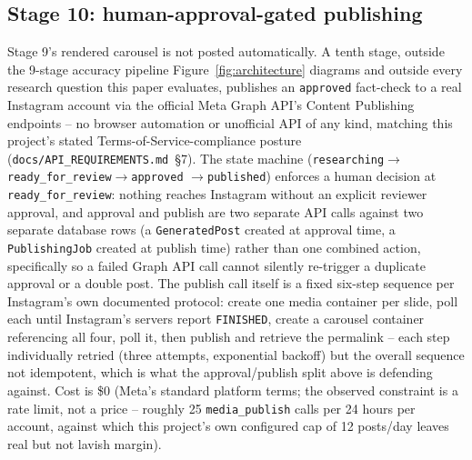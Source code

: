 \documentclass[conference]{IEEEtran}
\begin{document}
\subsection{Stage 10: human-approval-gated publishing}
\label{sec:publishing}
Stage 9's rendered carousel is not posted automatically. A tenth stage,
outside the 9-stage accuracy pipeline Figure~\ref{fig:architecture}
diagrams and outside every research question this paper evaluates,
publishes an \texttt{approved} fact-check to a real Instagram account via
the official Meta Graph API's Content Publishing endpoints -- no browser
automation or unofficial API of any kind, matching this project's stated
Terms-of-Service-compliance posture (\texttt{docs/API\_REQUIREMENTS.md}~\S7). The state machine
(\texttt{researching}$\to$\texttt{ready\_for\_review}$\to$\texttt{approved}
$\to$\texttt{published}) enforces a human decision at
\texttt{ready\_for\_review}: nothing reaches Instagram without an explicit
reviewer approval, and approval and publish are two separate API calls
against two separate database rows (a \texttt{GeneratedPost} created at
approval time, a \texttt{PublishingJob} created at publish time) rather
than one combined action, specifically so a failed Graph API call cannot
silently re-trigger a duplicate approval or a double post. The publish
call itself is a fixed six-step sequence per Instagram's own documented
protocol: create one media container per slide, poll each until
Instagram's servers report \texttt{FINISHED}, create a carousel container
referencing all four, poll it, then publish and retrieve the permalink --
each step individually retried (three attempts, exponential backoff) but
the overall sequence not idempotent, which is what the approval/publish
split above is defending against. Cost is \$0 (Meta's standard platform
terms; the observed constraint is a rate limit, not a price -- roughly 25
\texttt{media\_publish} calls per 24 hours per account, against which this
project's own configured cap of 12 posts/day leaves real but not
lavish margin).
\end{document}
